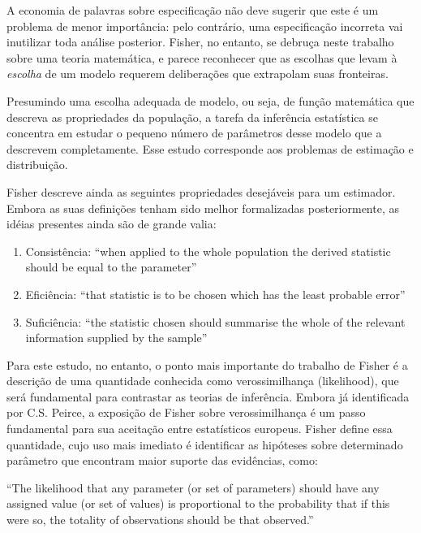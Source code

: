 A economia de palavras sobre especificação não deve sugerir que este é um problema de menor importância: pelo contrário,
uma especificação incorreta vai inutilizar toda análise posterior. Fisher, no entanto, se debruça neste trabalho sobre
uma teoria matemática, e parece reconhecer que as escolhas que levam à {\em escolha} de um modelo requerem deliberações
que extrapolam suas fronteiras.

Presumindo uma escolha adequada de modelo, ou seja,	de função matemática que descreva as propriedades da população,
a tarefa da inferência estatística se concentra em estudar o pequeno número de parâmetros desse modelo que a descrevem
completamente. Esse estudo corresponde aos problemas de estimação e distribuição.

Fisher descreve ainda as seguintes propriedades desejáveis para um estimador. Embora as suas definições tenham sido
melhor formalizadas posteriormente, as idéias presentes ainda são de grande valia:
\begin{enumerate}
	\item Consistência: ``when applied to the whole population the derived statistic should be equal to the parameter''
	\item Eficiência: ``that statistic is to be chosen which has the least probable error''
	\item Suficiência: ``the statistic chosen should summarise the whole of the relevant information supplied by the sample''
\end{enumerate}

Para este estudo, no entanto, o ponto mais importante do trabalho de Fisher é a descrição de uma quantidade conhecida como
verossimilhança (likelihood), que será fundamental para contrastar as teorias de inferência. Embora já identificada por C.S.
Peirce, a exposição de Fisher sobre verossimilhança é um passo fundamental para sua aceitação entre estatísticos europeus.
Fisher define essa quantidade,
cujo uso mais imediato é identificar as hipóteses sobre determinado parâmetro que encontram maior suporte das evidências,
como:

``The likelihood that any parameter (or set of parameters) should have
any assigned value (or set of values) is proportional to the probability
that if this were so, the totality of observations should be that observed.''\citep{Fisher1922}

